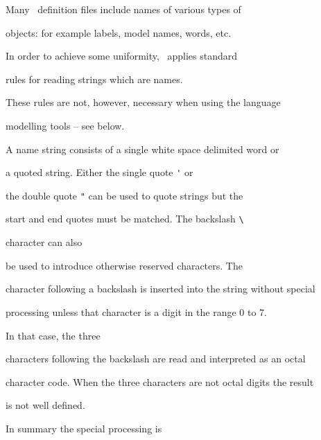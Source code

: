 




Many \HTK\  definition files include names of various types of


objects: for example labels, model names, words, etc.


In order to achieve some uniformity, \HTK\ applies standard


rules for reading strings which are names.


These rules are not, however, necessary when using the language


modelling tools -- see below.





A name string consists of a single white space delimited word or


a quoted string.  Either the single quote \verb+'+ or 


the double quote \verb+"+ can be used to quote strings but the


start and end quotes must be matched.  The backslash \verb+\+ 


character can also


be used to introduce otherwise reserved characters.  The 


character following a backslash is inserted into the string without special


processing unless that character is a digit in the range 0 to 7.  


In that case, the three


characters following the backslash are read and interpreted as an octal


character code.  When the three characters are not octal digits the result


is not well defined.





In summary the special processing is


